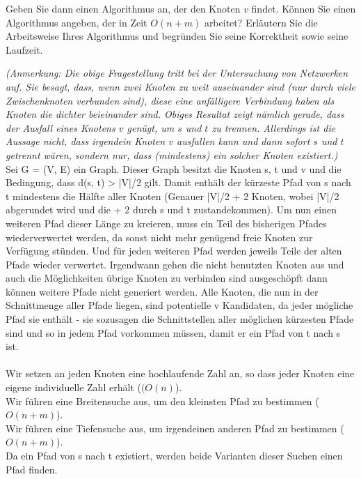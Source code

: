 \documentclass{article}
\begin{document}
Geben Sie dann einen Algorithmus an, der den Knoten $v$ findet.
Können Sie einen Algorithmus angeben, der in Zeit $O(n + m)$ arbeitet?
Erläutern Sie die Arbeitsweise Ihres Algorithmus und begründen Sie seine Korrektheit sowie seine Laufzeit.

\textit{
	(Anmerkung: Die obige Fragestellung tritt bei der Untersuchung von Netzwerken auf.
	Sie besagt, dass, wenn zwei Knoten zu weit auseinander sind (nur durch viele Zwischenknoten verbunden sind), diese eine anfälligere Verbindung haben als Knoten die dichter beieinander sind.
	Obiges Resultat zeigt nämlich gerade, dass der Ausfall eines Knotens $v$ genügt, um $s$ und $t$ zu trennen.
	Allerdings ist die Aussage nicht, dass irgendein Knoten $v$ ausfallen kann und dann sofort $s$ und $t$ getrennt wären, sondern nur, dass (mindestens) ein solcher Knoten existiert.)
}
\vspace{1cm}\-\\
Sei G = (V, E) ein Graph.
Dieser Graph besitzt die Knoten s, t und v und die Bedingung, dass d(s, t) > |V|/2 gilt.
Damit enthält der kürzeste Pfad von s nach t mindestens die Hälfte aller Knoten (Genauer |V|/2 + 2 Knoten, wobei |V|/2 abgerundet wird und die + 2 durch s und t zustandekommen).
Um nun einen weiteren Pfad dieser Länge zu kreieren, muss ein Teil des bisherigen Pfades wiederverwertet werden, da sonst nicht mehr genügend freie Knoten zur Verfügung stünden.
Und für jeden weiteren Pfad werden jeweils Teile der alten Pfade wieder verwertet.
Irgendwann gehen die nicht benutzten Knoten aus und auch die Möglichkeiten übrige Knoten zu verbinden sind ausgeschöpft dann können weitere Pfade nicht generiert werden.
Alle Knoten, die nun in der Schnittmenge aller Pfade liegen, sind potentielle v Kandidaten, da jeder mögliche Pfad sie enthält - sie sozusagen die Schnittstellen aller möglichen kürzesten Pfade sind und so in jedem Pfad vorkommen müssen, damit er ein Pfad von t nach s ist.
\\
\\
Wir setzen an jeden Knoten eine hochlaufende Zahl an, so dass jeder Knoten eine eigene individuelle Zahl erhält ($(O(n)$).\\
Wir führen eine Breitensuche aus, um den kleinsten Pfad zu bestimmen ($O(n + m)$).\\
Wir führen eine Tiefensuche aus, um irgendeinen anderen Pfad zu bestimmen ($O(n + m)$).\\
Da ein Pfad von s nach t existiert, werden beide Varianten dieser Suchen einen Pfad finden.\\
\end{document}
